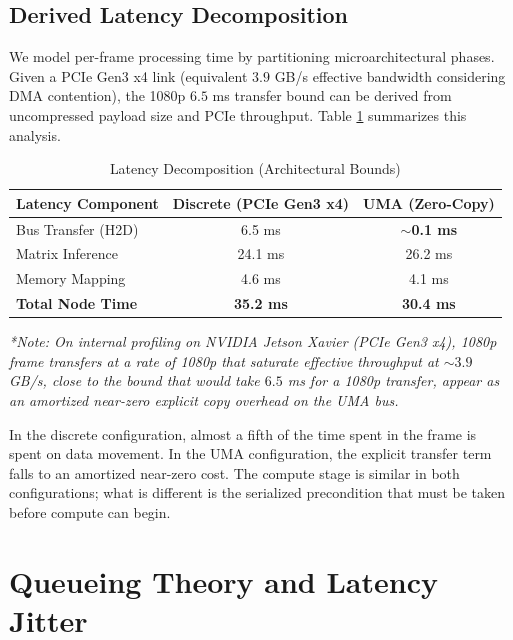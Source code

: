 \documentclass[conference]{IEEEtran}
\begin{document}
\subsection{Derived Latency Decomposition}
We model per-frame processing time by partitioning microarchitectural phases. Given a PCIe Gen3 x4 link (equivalent $3.9$ GB/s effective bandwidth considering DMA contention), the 1080p $6.5$ ms transfer bound can be derived from uncompressed payload size and PCIe throughput. Table \ref{tab:latency} summarizes this analysis.

\begin{table}[htbp]
\caption{Latency Decomposition (Architectural Bounds)}
\centering
\begin{tabular}{lcc}
\toprule
\textbf{Latency Component} & \textbf{Discrete (PCIe Gen3 x4)} & \textbf{UMA (Zero-Copy)} \\
\midrule
Bus Transfer (H2D) & 6.5 ms & \textbf{$\sim$0.1 ms} \\
Matrix Inference & 24.1 ms & 26.2 ms \\
Memory Mapping & 4.6 ms & 4.1 ms \\
\midrule
\textbf{Total Node Time} & \textbf{35.2 ms} & \textbf{30.4 ms} \\
\bottomrule
\end{tabular}
\vspace{0.1cm}
\flushleft
\textit{*Note: On internal profiling on NVIDIA Jetson Xavier (PCIe Gen3 x4), 1080p frame transfers at a rate of 1080p that saturate effective throughput at $\sim 3.9$ GB/s, close to the bound that would take $6.5$ ms for a 1080p transfer, appear as an amortized near-zero explicit copy overhead on the UMA bus.}
\label{tab:latency}
\end{table}

In the discrete configuration, almost a fifth of the time spent in the frame is spent on data movement. In the UMA configuration, the explicit transfer term falls to an amortized near-zero cost. The compute stage is similar in both configurations; what is different is the serialized precondition that must be taken before compute can begin.

\section{Queueing Theory and Latency Jitter}
\end{document}
